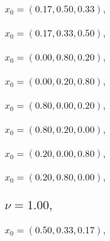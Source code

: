\documentclass[a4paper]{article}
\begin{document}
\begin{multicols*}{2}
   \subsubsection{\(x_0 = (0.17,0.50,0.33),\quad \)}
   

   \subsubsection{\(x_0 = (0.17,0.33,0.50),\quad \)}
   

   \subsubsection{\(x_0 = (0.00,0.80,0.20),\quad \)}
   

   \subsubsection{\(x_0 = (0.00,0.20,0.80),\quad \)}
   

   \subsubsection{\(x_0 = (0.80,0.00,0.20),\quad \)}
   

   \subsubsection{\(x_0 = (0.80,0.20,0.00),\quad \)}
   

   \subsubsection{\(x_0 = (0.20,0.00,0.80),\quad \)}
   

   \subsubsection{\(x_0 = (0.20,0.80,0.00),\quad \)}
   

   \subsection{\(\nu = 1.00,\quad \)}
   

   \subsubsection{\(x_0 = (0.50,0.33,0.17),\quad \)}
   


\end{multicols*}
\end{document}
